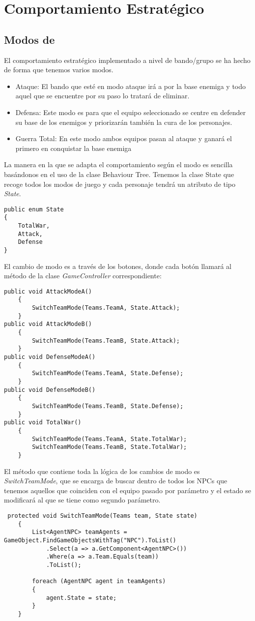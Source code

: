  \section{Comportamiento Estratégico}
 \subsection{Modos de }
 El comportamiento estratégico implementado a nivel de bando/grupo se ha hecho de forma que tenemos varios modos.
 \begin{itemize}
     \item Ataque: El bando que esté en modo ataque irá a por la base enemiga y todo aquel que se encuentre por su paso lo tratará de eliminar.
     \item Defensa: Este modo es para que el equipo seleccionado se centre en defender su base de los enemigos y priorizarán también la cura de los personajes.
     \item Guerra Total: En este modo ambos equipos pasan al ataque y ganará el primero en conquistar la base enemiga
 \end{itemize}
La manera en la que se adapta el comportamiento según el modo es sencilla basándonos en el uso de la clase Behaviour Tree. Tenemos la clase State que recoge todos los modos de juego y cada personaje tendrá un atributo de tipo \textit{State}.
 \begin{lstlisting}
public enum State
{
    TotalWar,
    Attack,
    Defense
}
\end{lstlisting}
El cambio de modo es a través de los botones, donde cada botón llamará al método de la clase \textit{GameController} correspondiente:
\begin{lstlisting}
public void AttackModeA()
    {
        SwitchTeamMode(Teams.TeamA, State.Attack);
    }
public void AttackModeB()
    {
        SwitchTeamMode(Teams.TeamB, State.Attack);
    }
public void DefenseModeA()
    {
        SwitchTeamMode(Teams.TeamA, State.Defense);
    }
public void DefenseModeB()
    {
        SwitchTeamMode(Teams.TeamB, State.Defense);
    }
public void TotalWar()
    {
        SwitchTeamMode(Teams.TeamA, State.TotalWar);
        SwitchTeamMode(Teams.TeamB, State.TotalWar);
    }
\end{lstlisting}
El método que contiene toda la lógica de los cambios de modo es 
\textit{SwitchTeamMode}, que se encarga de buscar dentro de todos los NPCs que tenemos  aquellos que coinciden con el equipo pasado por parámetro y el estado se modificará al que se tiene como segundo parámetro.
\begin{lstlisting}
 protected void SwitchTeamMode(Teams team, State state)
    {
        List<AgentNPC> teamAgents = GameObject.FindGameObjectsWithTag("NPC").ToList()
            .Select(a => a.GetComponent<AgentNPC>())
            .Where(a => a.Team.Equals(team))
            .ToList();

        foreach (AgentNPC agent in teamAgents)
        {
            agent.State = state;
        }
    }
\end{lstlisting}